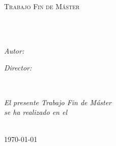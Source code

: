 \documentclass[
11pt, %
spanish, %
singlespacing, %
headsepline, %
]{MastersDoctoralThesis} %
\author{Unai \textsc{Sainz Estebanez}} %
\begin{document}
\renewcommand{\listtablename}{Índice de Tablas}
\renewcommand{\tablename}{Tabla}

\frontmatter %

\pagestyle{plain} %


\begin{titlepage}
\begin{center}

\vspace*{.06\textheight}
{\scshape\LARGE \univname\par}\vspace{1.5cm} %
\textsc{\Large Trabajo Fin de Máster}\\[0.5cm] %

\HRule \\[0.4cm] %
{\huge \bfseries \ttitle\par}\vspace{0.4cm} %
\HRule \\[1.5cm] %
 
\begin{minipage}[t]{0.4\textwidth}
\begin{flushleft} \large
\emph{Autor:}\\
\href{http://www.nuberoja.com}{\authorname} %
\end{flushleft}
\end{minipage}
\begin{minipage}[t]{0.4\textwidth}
\begin{flushright} \large
\emph{Director:} \\
\href{https://www.ehu.eus/es/web/gded/koldo}{\supname} %
\end{flushright}
\end{minipage}\\[3cm]
 
\vfill

\large \textit{El presente Trabajo Fin de Máster}\\[0.3cm] %
\textit{se ha realizado en el}\\[0.4cm]
\groupname\\[2cm] %
 
\vfill

{\large \today}\\[4cm] %
 
\vfill
\end{center}
\end{titlepage}
\end{document}
